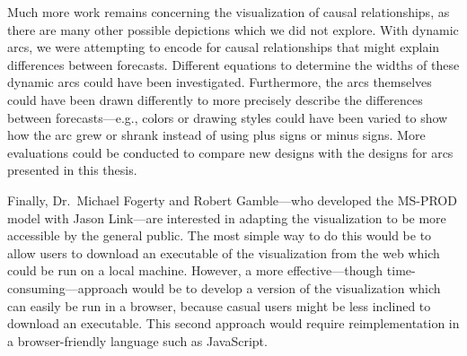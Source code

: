 Much more work remains concerning the visualization of causal relationships, as there are many other possible depictions which we did not explore.  With dynamic arcs, we were attempting to encode for causal relationships that might explain differences between forecasts.  Different equations to determine the widths of these dynamic arcs could have been investigated.  Furthermore, the arcs themselves could have been drawn differently to more precisely describe the differences between forecasts---e.g., colors or drawing styles could have been varied to show how the arc grew or shrank instead of using plus signs or minus signs.  More evaluations could be conducted to compare new designs with the designs for arcs presented in this thesis.

Finally, Dr.\ Michael Fogerty and Robert Gamble---who developed the MS-PROD model with Jason Link---are interested in adapting the visualization to be more accessible by the general public.  The most simple way to do this would be to allow users to download an executable of the visualization from the web which could be run on a local machine.  However, a more effective---though time-consuming---approach would be to develop a version of the visualization which can easily be run in a browser, because casual users might be less inclined to download an executable.  This second approach would require reimplementation in a browser-friendly language such as JavaScript.
